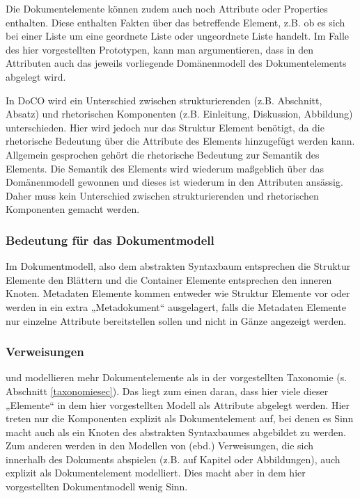 Die Dokumentelemente können zudem auch noch Attribute oder Properties enthalten. Diese enthalten Fakten über das betreffende Element, z.B. ob es sich bei einer Liste um eine geordnete Liste oder ungeordnete Liste handelt. Im Falle des hier vorgestellten Prototypen, kann man argumentieren, dass in den Attributen auch das jeweils vorliegende Domänenmodell des Dokumentelements abgelegt wird.

 
In DoCO wird ein Unterschied zwischen strukturierenden (z.B. Abschnitt, Absatz) und rhetorischen Komponenten (z.B. Einleitung, Diskussion, Abbildung) unterschieden. Hier wird jedoch nur das Struktur Element benötigt, da die rhetorische Bedeutung über die Attribute des Elements hinzugefügt werden kann. Allgemein gesprochen gehört die rhetorische Bedeutung zur Semantik des Elements. Die Semantik des Elements wird wiederum maßgeblich über das Domänenmodell gewonnen und dieses ist wiederum in den Attributen ansässig. Daher muss kein Unterschied zwischen strukturierenden und rhetorischen Komponenten gemacht werden.

 
\subsubsection{Bedeutung für das Dokumentmodell}\label{}

 
Im Dokumentmodell, also dem abstrakten Syntaxbaum entsprechen die Struktur Elemente den Blättern und die Container Elemente entsprechen den inneren Knoten. Metadaten Elemente kommen entweder wie Struktur Elemente vor oder werden in ein extra „Metadokument“ ausgelagert, falls die Metadaten Elemente nur einzelne Attribute bereitstellen sollen und nicht in Gänze angezeigt werden.

 
\subsubsection{Verweisungen}\label{}

 
\citep{Peroni} und \citep{NISO} modellieren mehr Dokumentelemente als in der vorgestellten Taxonomie (s. Abschnitt \ref{taxonomiesec}). Das liegt zum einen daran, dass hier viele dieser „Elemente“ in dem hier vorgestellten Modell als Attribute abgelegt werden. Hier treten nur die Komponenten explizit als Dokumentelement auf, bei denen es Sinn macht auch als ein Knoten des abstrakten Syntaxbaumes abgebildet zu werden. Zum anderen werden in den Modellen von (ebd.) Verweisungen, die sich innerhalb des Dokuments abspielen (z.B. auf Kapitel oder Abbildungen), auch explizit als Dokumentelement modelliert. Dies macht aber in dem hier vorgestellten Dokumentmodell wenig Sinn.

